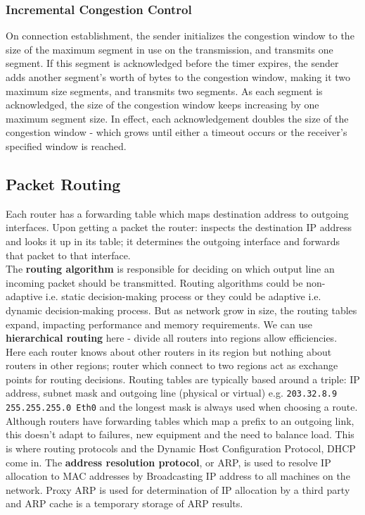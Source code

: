 \documentclass[twoside]{article}
\begin{document}
\subsubsection{Incremental Congestion Control}
On connection establishment, the sender initializes the congestion window to
the size of the maximum segment in use on the transmission, and transmits one
segment. If this segment is acknowledged before the timer expires, the sender
adds another segment's worth of bytes to the congestion window, making it two
maximum size segments, and transmits two segments. As each segment is acknowledged,
the size of the congestion window keeps increasing by one maximum segment size.
In effect, each acknowledgement doubles the size of the congestion window - 
which grows until either a timeout occurs or the receiver's specified window
is reached.
\subsection{Packet Routing}
Each router has a forwarding table which maps destination address to outgoing
interfaces. Upon getting a packet the router: inspects the destination IP
address and looks it up in its table; it determines the outgoing interface and
forwards that packet to that interface. \\

The \textbf{routing algorithm} is responsible for deciding on which output line
an incoming packet should be transmitted. Routing algorithms could be 
non-adaptive i.e. static decision-making process or they could be adaptive i.e.
dynamic decision-making process. But as network grow in size, the routing tables
expand, impacting performance and memory requirements. We can use \textbf{hierarchical 
routing} here - divide all routers into regions allow efficiencies. Here each 
router knows about other routers in its region but nothing about routers in other
regions; router which connect to two regions act as exchange points for routing 
decisions. Routing tables are typically based around a triple: IP address, 
subnet mask and outgoing line (physical or virtual) e.g. \texttt{203.32.8.9 
255.255.255.0 Eth0} and the longest mask is always used when choosing a route.
Although routers have forwarding tables which map a prefix to an outgoing link,
this doesn't adapt to failures, new equipment and the need to balance load. This
is where routing protocols and the Dynamic Host Configuration Protocol, DHCP 
come in. The \textbf{address resolution protocol}, or ARP, is used to resolve IP allocation
to MAC addresses by Broadcasting IP address to all machines on the network. Proxy
ARP is used for determination of IP allocation by a third party and ARP cache 
is a temporary storage of ARP results.
\end{document}

